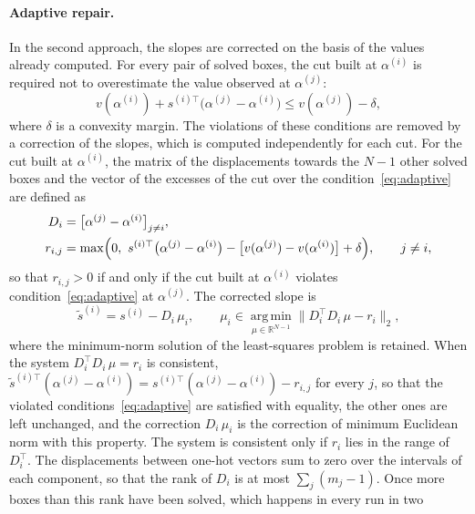 \documentclass[pdflatex,sn-basic]{sn-jnl}
\newcommand{\R}{\mathbb{R}}
\begin{document}
\paragraph{Adaptive repair.} In the second approach, the slopes are corrected on
the basis of the values already computed. For every pair of solved boxes, the
cut built at $\alpha^{(i)}$ is required not to overestimate the value observed at
$\alpha^{(j)}$:
\begin{equation}\label{eq:adaptive}
  v(\alpha^{(i)}) + s^{(i)\top}\bigl(\alpha^{(j)} - \alpha^{(i)}\bigr)
  \le v(\alpha^{(j)}) - \delta,
\end{equation}
where $\delta$ is a convexity margin. The violations of these conditions are
removed by a correction of the slopes, which is computed independently for each
cut. For the cut built at $\alpha^{(i)}$, the matrix of the displacements towards
the $N-1$ other solved boxes and the vector of the excesses of the cut over the
condition~\eqref{eq:adaptive} are defined as
\begin{align}
  D_i &= \bigl[\alpha^{(j)} - \alpha^{(i)}\bigr]_{j \ne i},
  \label{eq:repair-data}\\
  r_{i,j} &= \max\Bigl(0,\ s^{(i)\top}\bigl(\alpha^{(j)} - \alpha^{(i)}\bigr)
    - \bigl[v(\alpha^{(j)}) - v(\alpha^{(i)})\bigr] + \delta\Bigr),
  \qquad j \ne i,
  \label{eq:repair-excess}
\end{align}
so that $r_{i,j} > 0$ if and only if the cut built at $\alpha^{(i)}$ violates
condition~\eqref{eq:adaptive} at $\alpha^{(j)}$. The corrected slope is
\begin{equation}\label{eq:repair}
  \tilde s^{(i)} = s^{(i)} - D_i\,\mu_i,
  \qquad
  \mu_i \in \operatorname*{arg\,min}_{\mu \in \R^{N-1}}
    \bigl\| D_i^\top D_i\,\mu - r_i \bigr\|_2 ,
\end{equation}
where the minimum-norm solution of the least-squares problem is retained. When
the system $D_i^\top D_i\,\mu = r_i$ is consistent,
$\tilde s^{(i)\top}(\alpha^{(j)} - \alpha^{(i)})
 = s^{(i)\top}(\alpha^{(j)} - \alpha^{(i)}) - r_{i,j}$
for every $j$, so that the violated conditions~\eqref{eq:adaptive} are satisfied
with equality, the other ones are left unchanged, and the correction
$D_i\,\mu_i$ is the correction of minimum Euclidean norm with this property.
The system is consistent only if $r_i$ lies in the range of $D_i^\top$. The
displacements between one-hot vectors sum to zero over the intervals of each
component, so that the rank of $D_i$ is at most $\sum_j (m_j - 1)$. Once more
boxes than this rank have been solved, which happens in every run in two
\end{document}
